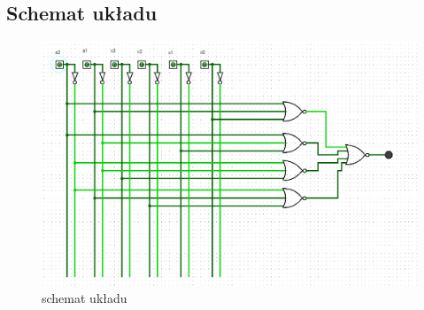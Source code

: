 \subsection{Schemat układu}

\begin{figure}[h!]
    \centering
    \includegraphics[width=\textwidth]{images/mux/mux_l.png}
    \caption{schemat układu}
    \label{fig:my_label}
\end{figure}

